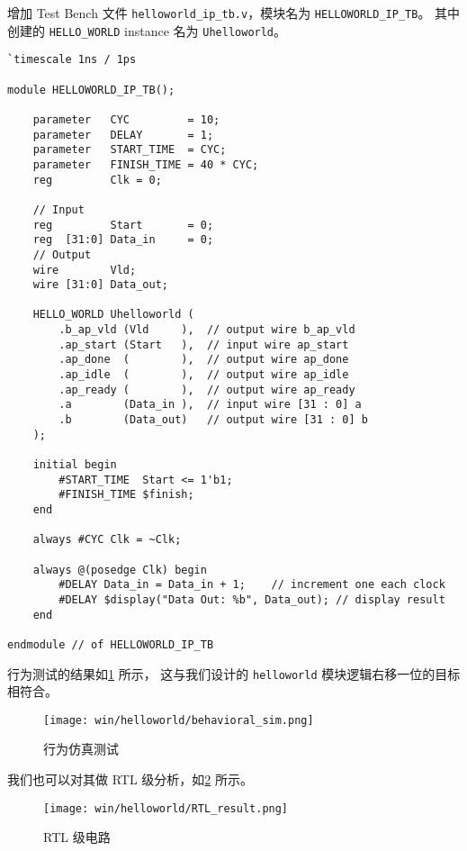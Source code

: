 \documentclass[Chinese,TC,use boldface,simple Names]{beaulivre}
\begin{document}
      增加 Test Bench 文件 \texttt{helloworld\_ip\_tb.v}，模块名为 \texttt{HELLOWORLD\_IP\_TB}。
      其中创建的 \texttt{HELLO\_WORLD} instance 名为 \texttt{Uhelloworld}。
      \begin{lstlisting}[style={v}, title={helloworld\_ip\_tb.v}]
`timescale 1ns / 1ps

module HELLOWORLD_IP_TB();

    parameter   CYC         = 10;
    parameter   DELAY       = 1;
    parameter   START_TIME  = CYC;
    parameter   FINISH_TIME = 40 * CYC;
    reg         Clk = 0;

    // Input
    reg         Start       = 0;
    reg  [31:0] Data_in     = 0;
    // Output
    wire        Vld;
    wire [31:0] Data_out;
        
    HELLO_WORLD Uhelloworld (
        .b_ap_vld (Vld     ),  // output wire b_ap_vld
        .ap_start (Start   ),  // input wire ap_start
        .ap_done  (        ),  // output wire ap_done
        .ap_idle  (        ),  // output wire ap_idle
        .ap_ready (        ),  // output wire ap_ready
        .a        (Data_in ),  // input wire [31 : 0] a
        .b        (Data_out)   // output wire [31 : 0] b
    );

    initial begin
        #START_TIME  Start <= 1'b1;
        #FINISH_TIME $finish;
    end
    
    always #CYC Clk = ~Clk;
    
    always @(posedge Clk) begin
        #DELAY Data_in = Data_in + 1;    // increment one each clock
        #DELAY $display("Data Out: %b", Data_out); // display result
    end
    
endmodule // of HELLOWORLD_IP_TB
      \end{lstlisting}

      行为测试的结果如\cref{fig:behavioral_sim} 所示，
      这与我们设计的 \texttt{helloworld} 模块逻辑右移一位的目标相符合。
      \begin{figure}[htbp]
        \centering
        \texttt{[image: win/helloworld/behavioral\_sim.png]}
        \caption{行为仿真测试}
        \label{fig:behavioral_sim}
      \end{figure}

      我们也可以对其做 RTL 级分析，如\cref{fig:RTL_result} 所示。
      \begin{figure}[htbp]
        \centering
        \texttt{[image: win/helloworld/RTL\_result.png]}
        \caption{RTL 级电路}
        \label{fig:RTL_result}
      \end{figure}
\end{document}
